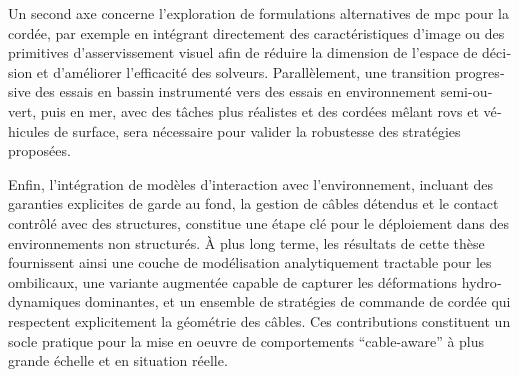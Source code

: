 \begin{otherlanguage}{french}
	Un second axe concerne l'exploration de formulations alternatives de \ac{mpc} pour la cordée, par
	exemple en intégrant directement des caractéristiques d'image ou des primitives d'asservissement
	visuel afin de réduire la dimension de l'espace de décision et d'améliorer l'efficacité des
	solveurs. Parallèlement, une transition progressive des essais en bassin instrumenté vers des
	essais en environnement semi-ouvert, puis en mer, avec des tâches plus réalistes et des cordées
	mêlant \acp{rov} et véhicules de surface, sera nécessaire pour valider la robustesse des stratégies
	proposées.

	Enfin, l'intégration de modèles d'interaction avec l'environnement, incluant des garanties
	explicites de garde au fond, la gestion de câbles détendus et le contact contrôlé avec des
	structures, constitue une étape clé pour le déploiement dans des environnements non structurés. À
	plus long terme, les résultats de cette thèse fournissent ainsi une couche de modélisation
	analytiquement tractable pour les ombilicaux, une variante augmentée capable de capturer les
	déformations hydrodynamiques dominantes, et un ensemble de stratégies de commande de cordée qui
	respectent explicitement la géométrie des câbles. Ces contributions constituent un socle pratique
	pour la mise en oeuvre de comportements \enquote{cable-aware} à plus grande échelle et en situation
	réelle.

\end{otherlanguage}